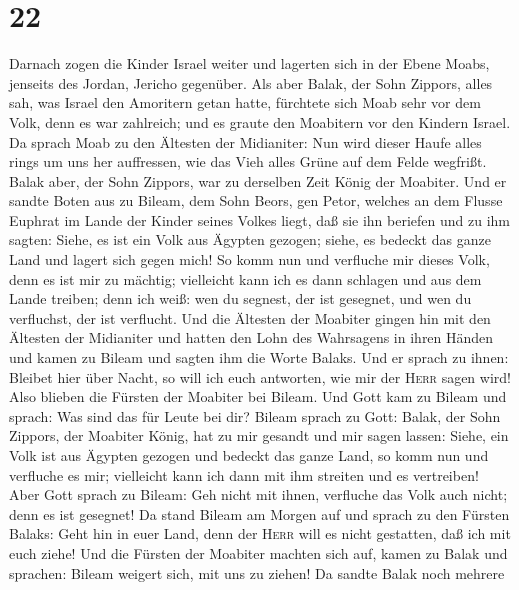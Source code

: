 \hypertarget{section-21}{%
\section{22}\label{section-21}}

 Darnach zogen die Kinder Israel weiter und lagerten sich
in der Ebene Moabs, jenseits des Jordan, Jericho gegenüber.
 Als aber Balak, der Sohn Zippors, alles sah, was Israel
den Amoritern getan hatte,  fürchtete sich Moab sehr vor
dem Volk, denn es war zahlreich; und es graute den Moabitern vor den
Kindern Israel.  Da sprach Moab zu den Ältesten der
Midianiter: Nun wird dieser Haufe alles rings um uns her auffressen, wie
das Vieh alles Grüne auf dem Felde wegfrißt. Balak aber, der Sohn
Zippors, war zu derselben Zeit König der Moabiter.  Und er
sandte Boten aus zu Bileam, dem Sohn Beors, gen Petor, welches an dem
Flusse Euphrat im Lande der Kinder seines Volkes liegt, daß sie ihn
beriefen und zu ihm sagten: Siehe, es ist ein Volk aus Ägypten gezogen;
siehe, es bedeckt das ganze Land und lagert sich gegen mich!
 So komm nun und verfluche mir dieses Volk, denn es ist
mir zu mächtig; vielleicht kann ich es dann schlagen und aus dem Lande
treiben; denn ich weiß: wen du segnest, der ist gesegnet, und wen du
verfluchst, der ist verflucht.  Und die Ältesten der
Moabiter gingen hin mit den Ältesten der Midianiter und hatten den Lohn
des Wahrsagens in ihren Händen und kamen zu Bileam und sagten ihm die
Worte Balaks.  Und er sprach zu ihnen: Bleibet hier über
Nacht, so will ich euch antworten, wie mir der \textsc{Herr} sagen wird!
Also blieben die Fürsten der Moabiter bei Bileam.  Und
Gott kam zu Bileam und sprach: Was sind das für Leute bei dir?
 Bileam sprach zu Gott: Balak, der Sohn Zippors, der
Moabiter König, hat zu mir gesandt und mir sagen lassen: 
Siehe, ein Volk ist aus Ägypten gezogen und bedeckt das ganze Land, so
komm nun und verfluche es mir; vielleicht kann ich dann mit ihm streiten
und es vertreiben!  Aber Gott sprach zu Bileam: Geh nicht
mit ihnen, verfluche das Volk auch nicht; denn es ist gesegnet!
 Da stand Bileam am Morgen auf und sprach zu den Fürsten
Balaks: Geht hin in euer Land, denn der \textsc{Herr} will es nicht
gestatten, daß ich mit euch ziehe!  Und die Fürsten der
Moabiter machten sich auf, kamen zu Balak und sprachen: Bileam weigert
sich, mit uns zu ziehen!  Da sandte Balak noch mehrere
